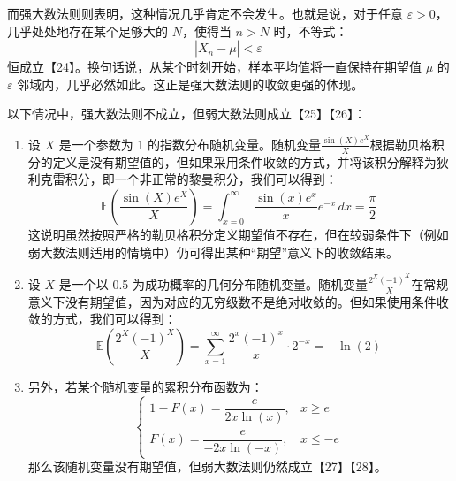 而强大数法则则表明，这种情况几乎肯定不会发生。也就是说，对于任意 $\varepsilon > 0$，几乎处处地存在某个足够大的 $N$，使得当 $n > N$ 时，不等式：
$$
|\overline{X}_n - \mu| < \varepsilon~
$$
恒成立【24】。换句话说，从某个时刻开始，样本平均值将一直保持在期望值 $\mu$ 的 $\varepsilon$ 邻域内，几乎必然如此。这正是强大数法则的收敛更强的体现。

以下情况中，强大数法则不成立，但弱大数法则成立【25】【26】：
\begin{enumerate}
\item 设 $X$ 是一个参数为 1 的指数分布随机变量。随机变量$\frac{\sin(X)e^{X}}{X}$根据勒贝格积分的定义是没有期望值的，但如果采用条件收敛的方式，并将该积分解释为狄利克雷积分，即一个非正常的黎曼积分，我们可以得到：
$$
\mathbb{E}\left(\frac{\sin(X)e^{X}}{X}\right) = \int_{x=0}^{\infty} \frac{\sin(x)e^{x}}{x} e^{-x} \, dx = \frac{\pi}{2}~
$$
这说明虽然按照严格的勒贝格积分定义期望值不存在，但在较弱条件下（例如弱大数法则适用的情境中）仍可得出某种“期望”意义下的收敛结果。
\item 设 $X$ 是一个以 0.5 为成功概率的几何分布随机变量。随机变量$\frac{2^{X}(-1)^{X}}{X}$在常规意义下没有期望值，因为对应的无穷级数不是绝对收敛的。但如果使用条件收敛的方式，我们可以得到：
$$
\mathbb{E}\left(\frac{2^{X}(-1)^{X}}{X}\right) = \sum_{x=1}^{\infty} \frac{2^{x}(-1)^{x}}{x} \cdot 2^{-x} = -\ln(2)~
$$
\item 另外，若某个随机变量的累积分布函数为：
$$
\begin{cases}
1 - F(x) = \dfrac{e}{2x \ln(x)}, & x \geq e \\
F(x) = \dfrac{e}{-2x \ln(-x)}, & x \leq -e
\end{cases}~
$$
那么该随机变量没有期望值，但弱大数法则仍然成立【27】【28】。

\end{enumerate}
